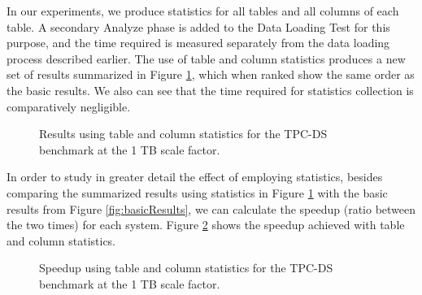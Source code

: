 In our experiments, we produce statistics for all tables and all columns of each table. A secondary Analyze phase is added to the Data Loading Test for this purpose, and the time required is measured separately from the data loading process described earlier. The use of table and column statistics produces a new set of results summarized in Figure \ref{fig:statsResults}, which when ranked show the same order as the basic results. We also can see that the time required for statistics collection is comparatively negligible. 

\begin{figure}
   \begin{center}
   \end{center}
   \caption{Results using table and column statistics for the TPC-DS benchmark at the 1 TB scale factor.}
   \label{fig:statsResults}
\end{figure}

In order to study in greater detail the effect of employing statistics, besides comparing the summarized results using statistics in Figure \ref{fig:statsResults} with the basic results from Figure \ref{fig:basicResults}, we can calculate the speedup (ratio between the two times) for each system. Figure \ref{fig:statsSpeedup} shows the speedup achieved with table and column statistics.

\begin{figure}
   \begin{center}
   \end{center}
   \caption{Speedup using table and column statistics for the TPC-DS benchmark at the 1 TB scale factor.}
   \label{fig:statsSpeedup}
\end{figure}


